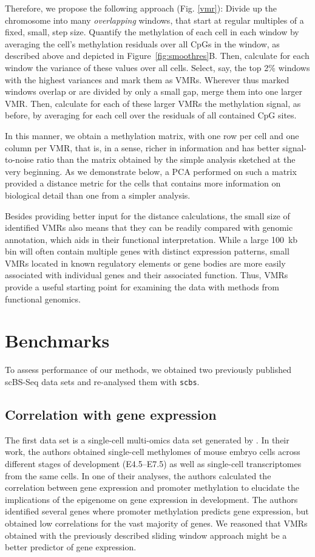 \documentclass[twocolumn,10pt]{article}
\begin{document}
Therefore, we propose the following approach (Fig. \ref{vmr}): Divide up the chromosome into many \emph{overlapping} windows, that start at regular multiples of a fixed, small, step size. Quantify the methylation of each cell in each window by averaging the cell's methylation residuals over all CpGs in the window, as described above and depicted in Figure\ \ref{fig:smoothres}B. Then, calculate for each window the variance of these values over all cells. Select, say, the top 2\% windows with the highest variances and mark them as VMRs. Wherever thus marked windows overlap or are divided by only a small gap, merge them into one larger VMR. Then, calculate for each of these larger VMRs the methylation signal, as before, by averaging for each cell over the residuals of all contained CpG sites.

In this manner, we obtain a methylation matrix, with one row per cell and one column per VMR, that is, in a sense, richer in information and has better signal-to-noise ratio than the matrix obtained by the simple analysis sketched at the very beginning. As we demonstrate below, a PCA performed on such a matrix provided a distance metric for the cells that contains more information on biological detail than one from a simpler analysis. 

Besides providing better input for the distance calculations, the small size of identified VMRs also means that they can be readily compared with genomic annotation, which aids in their functional interpretation.
While a large 100~kb bin will often contain multiple genes with distinct expression patterns, small VMRs located in known regulatory elements or gene bodies are more easily associated with individual genes and their associated function.
Thus, VMRs provide a useful starting point for examining the data with methods from functional genomics.

\section{Benchmarks}
To assess performance of our methods, we obtained two previously published scBS-Seq data sets and re-analysed them with \texttt{scbs}.

\subsection{Correlation with gene expression}

The first data set is a single-cell multi-omics data set generated by \citet{argelaguet2019gastru}. In their work, the authors obtained single-cell methylomes of mouse embryo cells across different stages of development (E4.5--E7.5) as well as single-cell transcriptomes from the same cells. In one of their analyses, the authors calculated the correlation between gene expression and promoter methylation to elucidate the implications of the epigenome on gene expression in development. The authors identified several genes where promoter methylation predicts gene expression, but obtained low correlations for the vast majority of genes. We reasoned that VMRs obtained with the previously described sliding window approach might be a better predictor of gene expression. 
\end{document}
